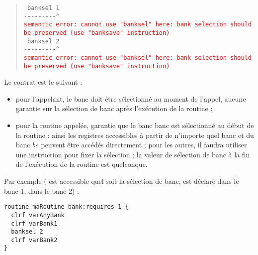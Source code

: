 \begin{quote}
\texttt{ banksel 1}\\
\texttt{-{-}-{-}-{-}-{-}-\^}\\
\textcolor{red}{\tt semantic error: cannot use "banksel" here: bank selection should be preserved (use "banksave" instruction)}\\

\texttt{  banksel 2}\\
\texttt{-{-}-{-}-{-}-{-}-\^}\\
\textcolor{red}{\tt semantic error: cannot use "banksel" here: bank selection should be preserved (use "banksave" instruction)}
\end{quote}














Le contrat est le suivant :
\begin{itemize}
  \item pour l'appelant, le banc  doit être sélectionné au moment de l'appel, aucune garantie sur la sélection de banc après l'exécution de la routine ; 
  \item pour la routine appelée, garantie que le banc  banc est sélectionné au début de la routine : ainsi les registres accessibles à partir de n'importe quel banc et du banc $be$ peuvent être accédés directement ; pour les autres, il faudra utiliser une instruction  pour fixer la sélection ; la valeur de sélection de banc à la fin de l'exécution de la routine est quelconque.
\end{itemize}

Par exemple ( est accessible quel soit la sélection de banc,  est déclaré dans le banc 1,  dans le banc 2) :
\begin{lstlisting}[language=piccolo]
routine maRoutine bank:requires 1 {
  clrf varAnyBank
  clrf varBank1
  banksel 2
  clrf varBank2
}
\end{lstlisting}








